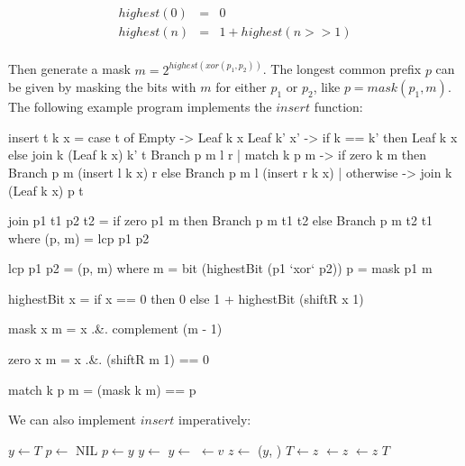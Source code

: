 \documentclass[b5paper]{article}
\begin{document}
\[
\begin{array}{rcl}
highest(0) & = & 0 \\
highest(n) & = & 1 + highest(n >> 1) \\
\end{array}
\]

Then generate a mask $m = 2^{highest(xor(p_1,p_2))}$. The longest common prefix $p$ can be given by masking the bits with $m$ for either $p_1$ or $p_2$, like $p = mask(p_1, m)$. The following example program implements the $insert$ function:

\begin{Haskell}
insert t k x
   = case t of
       Empty -> Leaf k x
       Leaf k' x' -> if k == k' then Leaf k x
                     else join k (Leaf k x) k' t
       Branch p m l r
          | match k p m -> if zero k m
                           then Branch p m (insert l k x) r
                           else Branch p m l (insert r k x)
          | otherwise -> join k (Leaf k x) p t

join p1 t1 p2 t2 = if zero p1 m then Branch p m t1 t2
                                else Branch p m t2 t1
    where
      (p, m) = lcp p1 p2

lcp p1 p2 = (p, m) where
    m = bit (highestBit (p1 `xor` p2))
    p = mask p1 m

highestBit x = if x == 0 then 0 else 1 + highestBit (shiftR x 1)

mask x m = x .&. complement (m - 1)

zero x m = x .&. (shiftR m 1) == 0

match k p m = (mask k m) == p
\end{Haskell}

We can also implement $insert$ imperatively:

\begin{algorithmic}[1]
    \State \Return {}
  \EndIf
  \State $y \gets T$
  \State $p \gets$ NIL
    \State $p \gets y$
      \State $y \gets$ 
    \Else
      \State $y \gets$ 
    \EndIf
  \EndWhile
    \State {} $\gets v$
  \Else
    \State $z \gets$ ($y$, )
      \State $T \gets z$
    \Else
        \State {} $\gets z$
      \Else
        \State {} $\gets z$
      \EndIf
    \EndIf
  \EndIf
  \State \Return $T$
\EndFunction
\end{algorithmic}
\end{document}
